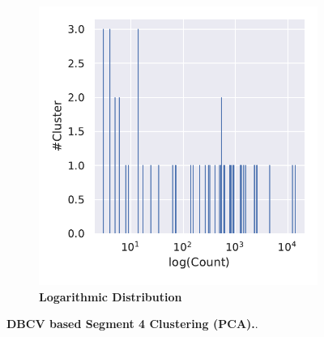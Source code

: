 \begin{figure}[!hbt]
\begin{subfigure}[b]{0.475\textwidth}
    \end{subfigure}
    \hfill
    \begin{subfigure}[b]{0.475\textwidth}
        \caption[Logarithmic Distribution]{\textbf{Logarithmic Distribution}}
        \label{subfig:PCA_Cluster_DBCV_Distribution_log_4}            \includegraphics[width=\textwidth]{PCA/Cluster_Distribution_Log_Segment_4_alternative.pdf}
    \end{subfigure}
    \caption[\Acrshort{DBCV} based Segment 4 Clustering (\Acrshort{PCA})]{\textbf{\Acrshort{DBCV} based Segment 4 Clustering (\Acrshort{PCA}).}.}
    \label{fig:PCA_Cluster_DBCV_4}
\end{figure}

